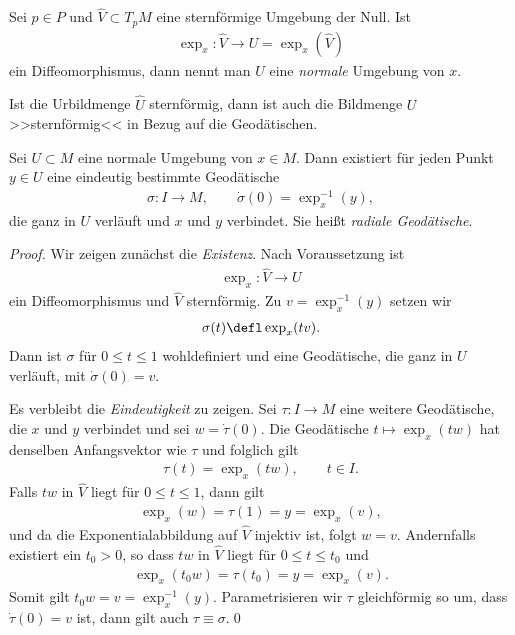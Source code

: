 \documentclass[%
	paper=a5,%
	fleqn,%
	DIV=18,%
	BCOR=0mm,
	fontsize=11pt,
	titlepage=false,%
	bibliography=totoc,
	DIV=18,%
	twoside=true,
	pdftitle=Riemannsche Geometrie,
	pdfauthor=Uwe Semmelmann,
	numbers=noendperiod]%
	{scrbook}
\begin{document}
\begin{defn}
Sei $p\in P$ und $\hat{V}\subset T_pM$ eine sternförmige Umgebung der Null. Ist
\begin{align*}
\exp_x : \hat{V}\to U = \exp_x(\hat{V})
\end{align*}
ein Diffeomorphismus, dann nennt man $U$ eine \emph{normale} Umgebung von
$x$.\fish
\end{defn}

Ist die Urbildmenge $\hat{U}$ sternförmig, dann ist auch die Bildmenge $U$
>>sternförmig<< in Bezug auf die Geodätischen.

\begin{lem} 
Sei $U\subset M$ eine normale Umgebung von $x\in M$. Dann existiert für jeden
Punkt $y\in U$ eine eindeutig bestimmte Geodätische
\begin{align*}
\sigma\colon I\to M,\qquad \dot{\sigma}(0) = \exp_x^{-1}(y),
\end{align*}
die ganz in $U$ verläuft und $x$ und $y$ verbindet. Sie heißt \emph{radiale Geodätische}.\fish
\end{lem}
\begin{proof}
Wir zeigen zunächst die \textit{Existenz}. Nach Voraussetzung ist
\begin{align*}
\exp_x \colon \hat{V}\to U
\end{align*}
ein Diffeomorphismus und $\hat{V}$ sternförmig. Zu $v= \exp_x^{-1}(y)$
setzen wir
\begin{align*}
\sigma(t) \defl \exp_x(tv).
\end{align*}
Dann ist $\sigma$ für $0\le t\le 1$ wohldefiniert und eine Geodätische, die ganz
in $U$ verläuft, mit $\dot{\sigma}(0) = v$.

Es verbleibt die \textit{Eindeutigkeit} zu zeigen. Sei $\tau\colon I\to M$ eine
weitere Geodätische, die $x$ und $y$ verbindet und sei $w = \dot{\tau}(0)$. Die
Geodätische $t\mapsto \exp_x(tw)$ hat denselben Anfangsvektor wie $\tau$ und
folglich gilt
\begin{align*}
\tau(t) = \exp_x(tw),\qquad t\in I.
\end{align*}
Falls $tw$ in $\hat{V}$ liegt für $0\le t\le 1$, dann gilt
\begin{align*}
\exp_x(w) = \tau(1) = y = \exp_x(v),
\end{align*}
und da die Exponentialabbildung auf $\hat{V}$ injektiv ist, folgt $w = v$. 
Andernfalls existiert ein $t_0 > 0$, so dass $tw$ in $\hat{V}$ liegt für $0\le
t\le t_0$ und
\begin{align*}
\exp_x(t_0 w) = \tau(t_0) = y = \exp_x(v).
\end{align*} 
Somit gilt $t_0w = v = \exp_x^{-1}(y)$. Parametrisieren wir $\tau$
gleichförmig so um, dass $\dot{\tau}(0) = v$ ist, dann gilt auch $\tau\equiv
\sigma$.\qed
\end{proof}
\end{document}
